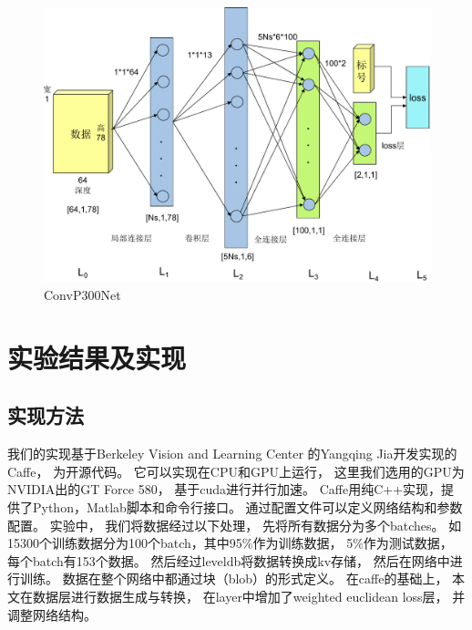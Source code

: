 \begin{figure}[htb]
  \centering
  \includegraphics[scale=0.7]{Pictures/CNN/cnn_network-crop.pdf}
  \caption{ConvP300Net}\label{fig:p300cnn_network}
\end{figure}






\section{实验结果及实现}\label{sec:cnn_experiment}


\subsection{实现方法}
我们的实现基于Berkeley Vision and Learning Center 的Yangqing Jia开发实现的Caffe\cite{jia2014caffe}， 为开源代码。 它可以实现在CPU和GPU上运行， 这里我们选用的GPU为NVIDIA出的GT Force 580， 基于cuda进行并行加速。 Caffe用纯C++实现，提供了Python，Matlab脚本和命令行接口。 通过配置文件可以定义网络结构和参数配置。 实验中， 我们将数据经过以下处理， 先将所有数据分为多个batches。 如15300个训练数据分为100个batch，其中95\%作为训练数据， 5\%作为测试数据， 每个batch有153个数据。 然后经过leveldb将数据转换成kv存储， 然后在网络中进行训练。 数据在整个网络中都通过块（blob）的形式定义。 在caffe的基础上， 本文在数据层进行数据生成与转换， 在layer中增加了weighted euclidean loss层， 并调整网络结构。


